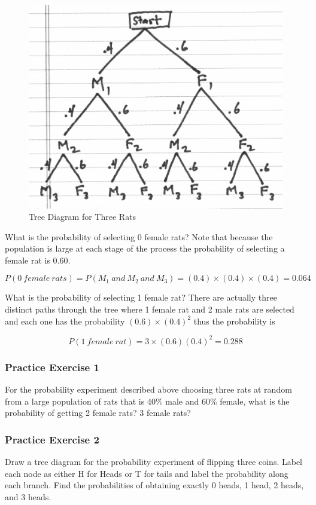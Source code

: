 \documentclass[]{book}
\theoremstyle{definition}
\theoremstyle{definition}
\theoremstyle{definition}
\theoremstyle{remark}
\begin{document}
\begin{figure}

{\centering \includegraphics[width=0.6\linewidth]{01-basics-figures/tree_rat_sex} 

}

\caption{Tree Diagram for Three Rats}\label{fig:nice-fig-4}
\end{figure}

What is the probability of selecting 0 female rats? Note that because
the population is large at each stage of the process the probability of
selecting a female rat is 0.60.

\[P(0\ female\ rats) = P(M_{1}\ and\ M_{2}\ and\ M_{3}) = (0.4) \times (0.4) \times (0.4) = 0.064\]

What is the probability of selecting 1 female rat? There are actually
three distinct paths through the tree where 1 female rat and 2 male rats
are selected and each one has the probability \((0.6) \times (0.4)^2\)
thus the probability is

\[P(1\ female\ rat) = 3 \times (0.6) (0.4)^2 = 0.288\]

\subsubsection{Practice Exercise 1}\label{practice-exercise-1}

For the probability experiment described above choosing three rats at
random from a large population of rats that is 40\% male and 60\%
female, what is the probability of getting 2 female rats? 3 female rats?

\subsubsection{Practice Exercise 2}\label{practice-exercise-2}

Draw a tree diagram for the probability experiment of flipping three
coins. Label each node as either H for Heads or T for tails and label
the probability along each branch. Find the probabilities of obtaining
exactly 0 heads, 1 head, 2 heads, and 3 heads.
\end{document}
